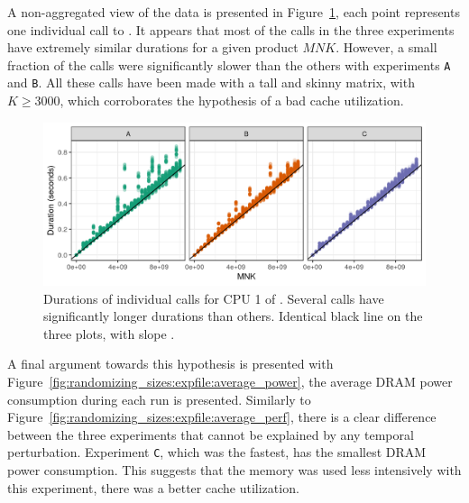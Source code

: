             A non-aggregated view of the data is presented in Figure~\ref{fig:randomizing_sizes:expfile:raw_data}, each
            point represents one individual call to \dgemm. It appears that most of the calls in the three experiments
            have extremely similar durations for a given product \(MNK\). However, a small fraction of the \dgemm calls
            were significantly slower than the others with experiments \texttt{A} and \texttt{B}. All these calls have
            been made with a tall and skinny matrix, with \(K\geq3000\), which corroborates the hypothesis of a bad
            cache utilization.

            \begin{figure}[htpb]
                \centering
                \includegraphics[width=\linewidth]{img/experiment/randomizing_sizes/expfile/raw_data.png}
                \caption{Durations of individual \dgemm calls for CPU 1 of \dahu[5].
                Several calls have significantly longer durations than others. Identical black line on the three plots,
                with slope .}%
                \label{fig:randomizing_sizes:expfile:raw_data}
            \end{figure}

            A final argument towards this hypothesis is presented with
            Figure~\ref{fig:randomizing_sizes:expfile:average_power}, the average DRAM power consumption during each run
            is presented. Similarly to Figure~\ref{fig:randomizing_sizes:expfile:average_perf}, there is a clear
            difference between the three experiments that cannot be explained by any temporal perturbation. Experiment
            \texttt{C}, which was the fastest, has the smallest DRAM power consumption. This suggests that the memory
            was used less intensively with this experiment, \ie there was a better cache utilization.

